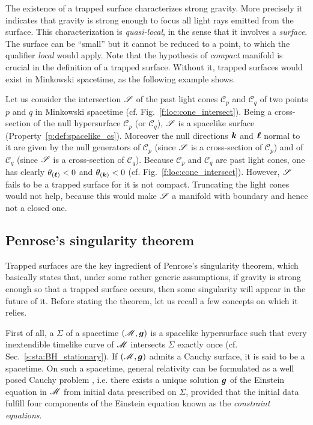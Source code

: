 The existence of a trapped surface characterizes
strong gravity. More precisely it indicates that gravity is strong enough
to focus all light rays emitted from the surface.
This characterization is \emph{quasi-local}, in the sense that it involves a \emph{surface}. The
surface can be ``small'' but it cannot be reduced to a point, to which the qualifier \emph{local}
would apply. Note that the hypothesis of \emph{compact} manifold is crucial in the definition of a
trapped surface. Without it, trapped surfaces would exist in Minkowski
spacetime, as the following example shows.

\begin{example}
Let us consider the intersection $\mathscr{S}$ of the past light cones $\mathscr{C}_p$ and $\mathscr{C}_q$
of two points $p$ and $q$ in Minkowski spacetime (cf. Fig.~\ref{f:loc:cone_intersect}).
Being a cross-section of the null hypersurface $\mathscr{C}_p$ (or $\mathscr{C}_q$),
$\mathscr{S}$ is a spacelike surface (Property~\ref{p:def:spacelike_cs}).
Moreover the null directions $\bm{k}$ and $\bm{\ell}$ normal to it are given by the null generators of
$\mathscr{C}_p$ (since $\mathscr{S}$ is a cross-section of $\mathscr{C}_p$)
and of $\mathscr{C}_q$ (since $\mathscr{S}$ is a cross-section of $\mathscr{C}_q$).
Because $\mathscr{C}_p$ and $\mathscr{C}_q$ are past light cones, one has clearly
$\theta_{(\bm{\ell})} < 0$ and $\theta_{(\bm{k})} < 0$ (cf. Fig.~\ref{f:loc:cone_intersect}).
However, $\mathscr{S}$ fails to be a trapped surface for it is not compact. Truncating the light cones
would not help, because this would make $\mathscr{S}$ a manifold with boundary and hence not a closed one.
\end{example}


\subsection{Penrose's singularity theorem}

Trapped surfaces are the key ingredient of Penrose's singularity theorem,
which basically states that, under some rather generic assumptions, if gravity is
strong enough so that a trapped surface occurs, then some singularity will
appear in the future of it.
Before stating the theorem, let us recall a few concepts on which it relies.

First of all, a 
$\Sigma$ of a spacetime $(\mathscr{M},\bm{g})$ is a spacelike
hypersurface such that every inextendible timelike curve of $\mathscr{M}$
intersects $\Sigma$ exactly once (cf. Sec.~\ref{s:sta:BH_stationary}). If $(\mathscr{M},\bm{g})$
admits a Cauchy surface, it is said to be a
 spacetime.
On such a spacetime, general relativity can be formulated as a well posed
Cauchy problem \cite{ChoquG69},
i.e. there exists a unique solution $\bm{g}$ of the Einstein equation
in $\mathscr{M}$ from initial data prescribed on $\Sigma$, provided that the initial data
fulfill four components of the Einstein equation known as the
\emph{constraint equations}.

